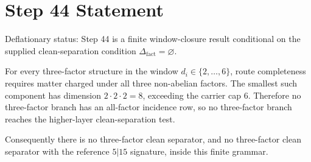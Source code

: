 \documentclass[11pt]{article}
\begin{document}
\section*{Step 44 Statement}
Deflationary status: Step 44 is a finite window-closure result conditional on the supplied clean-separation condition $\Delta_{\mathrm{fact}}=\varnothing$.

For every three-factor structure in the window \(d_i \in \{2,\ldots,6\}\), route completeness requires matter charged under all three non-abelian factors. The smallest such component has dimension \(2\cdot2\cdot2=8\), exceeding the carrier cap 6. Therefore no three-factor branch has an all-factor incidence row, so no three-factor branch reaches the higher-layer clean-separation test.

Consequently there is no three-factor clean separator, and no three-factor clean separator with the reference \(5|15\) signature, inside this finite grammar.
\end{document}
